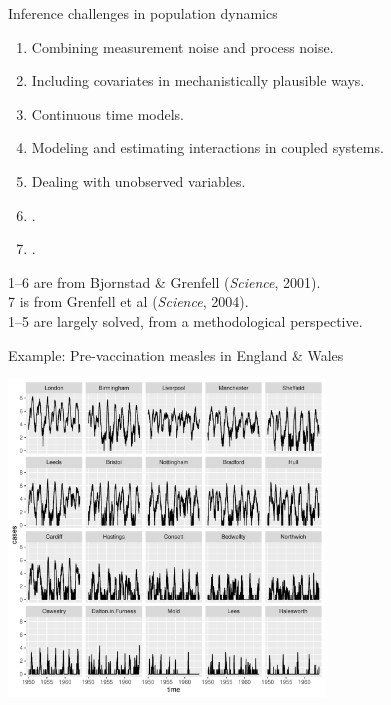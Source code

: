 \documentclass{beamer}
\begin{document}
\begin{frame}{Inference challenges in population dynamics}

  \begin{enumerate}
\item Combining measurement noise and process noise.
\item Including covariates in mechanistically plausible ways.
\item  Continuous time models.
\item  Modeling and estimating interactions in coupled systems.
\item  Dealing with unobserved variables.
\item  {}.
\item  {}.
  \end{enumerate}

  \vspace{3mm}
  
  1--6 are from Bjornstad \& Grenfell ({\it Science}, 2001).\\
  7 is from Grenfell et al ({\it Science}, 2004).\\
  1--5 are largely solved, from a methodological perspective.
  
  
\end{frame}

\begin{frame}{Example: Pre-vaccination measles in England \& Wales}

\vspace{-2mm}

\begin{center}
\includegraphics[width=8.4cm]{he10-data.pdf}


\end{center}

\vspace{-2mm}
  
\end{frame}
\end{document}
